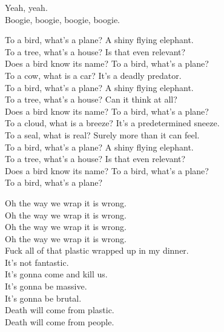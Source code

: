 Yeah, yeah. \\
Boogie, boogie, boogie, boogie. \\




To a bird, what's a plane? A shiny flying elephant. \\
To a tree, what's a house? Is that even relevant? \\

Does a bird know its name? To a bird, what's a plane? \\

To a cow, what is a car? It's a deadly predator. \\
To a bird, what's a plane? A shiny flying elephant. \\
To a tree, what's a house? Can it think at all? \\

Does a bird know its name? To a bird, what's a plane? \\

To a cloud, what is a breeze? It's a predetermined sneeze. \\
To a seal, what is real? Surely more than it can feel. \\
To a bird, what's a plane? A shiny flying elephant. \\
To a tree, what's a house? Is that even relevant? \\

Does a bird know its name? To a bird, what's a plane? \\

To a bird, what's a plane? \\




Oh the way we wrap it is wrong. \\
Oh the way we wrap it is wrong. \\
Oh the way we wrap it is wrong. \\
Oh the way we wrap it is wrong. \\

Fuck all of that plastic wrapped up in my dinner. \\
It's not fantastic. \\
It's gonna come and kill us. \\
It's gonna be massive. \\
It's gonna be brutal. \\
Death will come from plastic. \\
Death will come from people. \\

